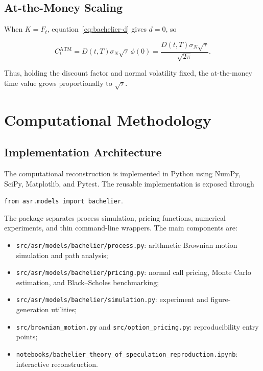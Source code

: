 \documentclass[11pt,a4paper]{article}
\begin{document}
\subsection{At-the-Money Scaling}

When \(K=F_t\), equation~\eqref{eq:bachelier-d} gives \(d=0\), so

\begin{equation}
C_t^{\mathrm{ATM}}=D(t,T)\sigma_N\sqrt{\tau}\,\phi(0)
=\frac{D(t,T)\sigma_N\sqrt{\tau}}{\sqrt{2\pi}}.
\label{eq:atm-scaling}
\end{equation}

Thus, holding the discount factor and normal volatility fixed, the at-the-money time value grows proportionally to \(\sqrt{\tau}\).

\section{Computational Methodology}

\subsection{Implementation Architecture}

The computational reconstruction is implemented in Python using NumPy, SciPy, Matplotlib, and Pytest. The reusable implementation is exposed through

\begin{center}
\texttt{from asr.models import bachelier}.
\end{center}

The package separates process simulation, pricing functions, numerical experiments, and thin command-line wrappers. The main components are:

\begin{itemize}[leftmargin=2.2em]
\item \texttt{src/asr/models/bachelier/process.py}: arithmetic Brownian motion simulation and path analysis;
\item \texttt{src/asr/models/bachelier/pricing.py}: normal call pricing, Monte Carlo estimation, and Black--Scholes benchmarking;
\item \texttt{src/asr/models/bachelier/simulation.py}: experiment and figure-generation utilities;
\item \texttt{src/brownian\_motion.py} and \texttt{src/option\_pricing.py}: reproducibility entry points;
\item \texttt{notebooks/bachelier\_theory\_of\_speculation\_reproduction.ipynb}: interactive reconstruction.
\end{itemize}
\end{document}
